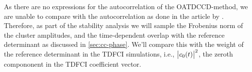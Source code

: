 
        As there are no expressions for the autocorrelation of the
        OATDCCD-method, we are unable to compare with the autocorrelation as
        done in the article by \citeauthor{pedersen2018symplectic}.
        Therefore, as part of the stability analysis we will sample the
        Frobenius norm of the cluster amplitudes, and the time-dependent overlap
        with the reference determinant as discussed in \autoref{sec:cc-phase}.
        We'll compare this with the weight of the reference determinant in the
        TDFCI simulations, i.e., $\abs{c_0(t)}^2$, the zeroth compononent in the
        TDFCI coefficient vector.

